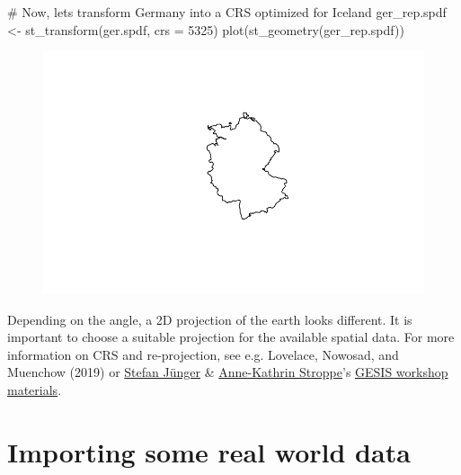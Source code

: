 \documentclass[
  letterpaper,
]{scrbook}
\newenvironment{Shaded}{\begin{snugshade}}{\end{snugshade}}
\newcommand{\AttributeTok}[1]{\textcolor[rgb]{0.40,0.45,0.13}{#1}}
\newcommand{\CommentTok}[1]{\textcolor[rgb]{0.37,0.37,0.37}{#1}}
\newcommand{\DecValTok}[1]{\textcolor[rgb]{0.68,0.00,0.00}{#1}}
\newcommand{\FunctionTok}[1]{\textcolor[rgb]{0.28,0.35,0.67}{#1}}
\newcommand{\NormalTok}[1]{\textcolor[rgb]{0.00,0.23,0.31}{#1}}
\newcommand{\OtherTok}[1]{\textcolor[rgb]{0.00,0.23,0.31}{#1}}
\begin{document}
\begin{Shaded}
\begin{Highlighting}[]
\CommentTok{\# Now, let\textquotesingle{}s transform Germany into a CRS optimized for Iceland}
\NormalTok{ger\_rep.spdf }\OtherTok{\textless{}{-}} \FunctionTok{st\_transform}\NormalTok{(ger.spdf, }\AttributeTok{crs =} \DecValTok{5325}\NormalTok{)}
\FunctionTok{plot}\NormalTok{(}\FunctionTok{st\_geometry}\NormalTok{(ger\_rep.spdf))}
\end{Highlighting}
\end{Shaded}

\begin{figure}[H]

{\centering \includegraphics{01_refresher_files/figure-pdf/unnamed-chunk-5-2.pdf}

}

\end{figure}

Depending on the angle, a 2D projection of the earth looks different. It
is important to choose a suitable projection for the available spatial
data. For more information on CRS and re-projection, see e.g. Lovelace,
Nowosad, and Muenchow (2019) or
\href{https://stefanjuenger.github.io/}{Stefan Jünger} \&
\href{https://www.gesis.org/institut/mitarbeitendenverzeichnis/person/Anne-Kathrin.Stroppe}{Anne-Kathrin
Stroppe}'s
\href{https://github.com/StefanJuenger/gesis-workshop-geospatial-techniques-R-2023}{GESIS
workshop materials}.

\hypertarget{importing-some-real-world-data}{%
\section{Importing some real world
data}\label{importing-some-real-world-data}}
\end{document}
